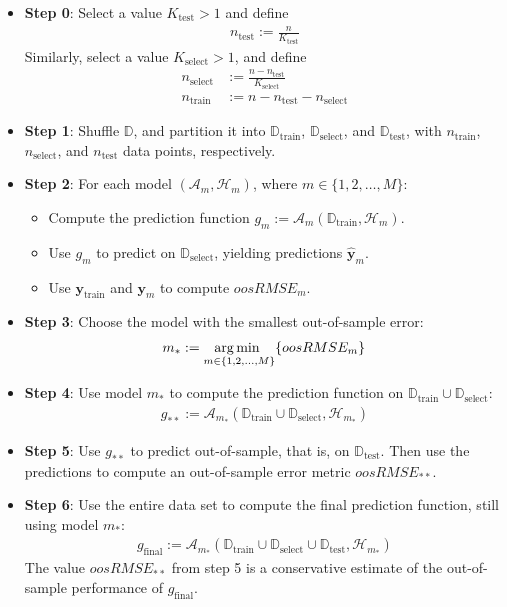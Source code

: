 \documentclass[12pt]{article}
\newcommand{\train}{\text{train}}
\newcommand{\select}{\text{select}}
\newcommand{\test}{\text{test}}
\newcommand{\Dtrain}{\mathbb{D}_\train}
\newcommand{\Dselect}{\mathbb{D}_\select}
\newcommand{\Dtest}{\mathbb{D}_\test}
\begin{document}
\begin{enumerate}
\begin{itemize}
	\item \textbf{Step 0}: Select a value $K_\test >1$ and define
	\begin{align*}
		n_\test := \frac{n}{K_\test}
	\end{align*}
	Similarly, select a value $K_\select>1$, and define
	\begin{align*}
		n_\select &:= \frac{n - n_\test}{K_\select}\\
		n_\train &:= n - n_\test - n_\select
	\end{align*}
	\item \textbf{Step 1}: Shuffle $\mathbb{D}$, and partition it into
	$\Dtrain$, $\Dselect$, and $\Dtest$, with $n_\train$, $n_\select$, and $n_\test$
	data points, respectively.
	\item \textbf{Step 2}: For each model $(\mathcal{A}_m, \mathcal{H}_m)$, where
	$m\in \{1,2,\ldots,M\}$:
	\begin{itemize}
		\item Compute the prediction function $g_m := \mathcal{A}_m(\Dtrain, \mathcal{H}_m)$.
		\item Use $g_m$ to predict on $\Dselect$, yielding predictions $\hat{\bm{y}}_m$.
		\item Use $\bm{y}_{\text{train}}$ and $\bm{y}_m$ to compute $oosRMSE_m$.
	\end{itemize}
	\item \textbf{Step 3}: Choose the model with the smallest out-of-sample error:
	\begin{align*}
		m_* := \underset{m\in\{1,2,\ldots,M\}}{\operatorname*{arg\,min~}} \{ oosRMSE_m\}
	\end{align*}
	\item \textbf{Step 4}: Use model $m_*$ to compute the prediction function
	on $\Dtrain \cup \Dselect$:
	\begin{align*}
		g_{**} := \mathcal{A}_{m_*}(\Dtrain \cup \Dselect, \mathcal{H}_{m_*})
	\end{align*}
	\item \textbf{Step 5}: Use $g_{**}$ to predict out-of-sample, that is, on $\Dtest$.
	Then use the predictions to compute an out-of-sample error metric $oosRMSE_{**}$.
	\item \textbf{Step 6}: Use the entire data set to compute the final prediction function,
	still using model $m_*$:
	\begin{align*}
		g_{\text{final}}
		:= \mathcal{A}_{m_*}(\Dtrain \cup \Dselect \cup \Dtest, \mathcal{H}_{m_*})
	\end{align*}
	The value $oosRMSE_{**}$ from step 5 is a conservative estimate of the out-of-sample
	performance of $g_{\text{final}}$.
\end{itemize}


\end{enumerate}
\end{document}
